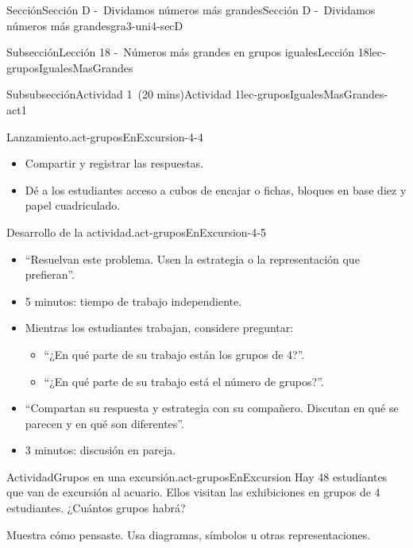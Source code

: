 \documentclass[oneside,10pt,]{article}
\begin{document}
\begin{sectionptx}{Sección}{Sección D -~Dividamos números más grandes}{}{Sección D -~Dividamos números más grandes}{}{}{gra3-uni4-secD}
\begin{subsectionptx}{Subsección}{Lección 18 -~Números más grandes en grupos iguales}{}{Lección 18}{}{}{lec-gruposIgualesMasGrandes}
\begin{subsubsectionptx}{Subsubsección}{Actividad 1~(20 mins)}{}{Actividad 1}{}{}{lec-gruposIgualesMasGrandes-act1}
\begin{paragraphs}{Lanzamiento.}{act-gruposEnExcursion-4-4}
\begin{itemize}[label=\textbullet]
\item{}Compartir y registrar las respuestas.%
\item{}Dé a los estudiantes acceso a cubos de encajar o fichas, bloques en base diez y papel cuadriculado.%
\end{itemize}
\end{paragraphs}%
\begin{paragraphs}{Desarrollo de la actividad.}{act-gruposEnExcursion-4-5}%
%
\begin{itemize}[label=\textbullet]
\item{}``Resuelvan este problema. Usen la estrategia o la representación que prefieran''.%
\item{}5 minutos: tiempo de trabajo independiente.%
\item{}Mientras los estudiantes trabajan, considere preguntar:%
%
\begin{itemize}[label=$\circ$]
\item{}``¿En qué parte de su trabajo están los grupos de 4?''.%
\item{}``¿En qué parte de su trabajo está el número de grupos?''.%
\end{itemize}
\item{}``Compartan su respuesta y estrategia con su compañero. Discutan en qué se parecen y en qué son diferentes''.%
\item{}3 minutos: discusión en pareja.%
\end{itemize}
\end{paragraphs}%
\begin{activity}{Actividad}{Grupos en una excursión.}{act-gruposEnExcursion}%
Hay 48 estudiantes que van de excursión al acuario. Ellos visitan las exhibiciones en grupos de 4 estudiantes. ¿Cuántos grupos habrá?%
\par
Muestra cómo pensaste. Usa diagramas, símbolos u otras representaciones.%
\begin{image}{0.15}{0.7}{0.15}{}%

\end{image}
\end{activity}
\end{subsubsectionptx}
\end{subsectionptx}
\end{sectionptx}
\end{document}
